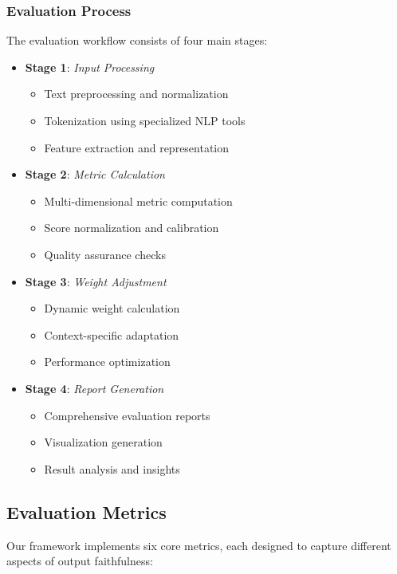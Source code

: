 \subsubsection{Evaluation Process}
The evaluation workflow consists of four main stages:
\begin{itemize}
    \item \textbf{Stage 1}: \textit{Input Processing}
    \begin{itemize}
        \item Text preprocessing and normalization
        \item Tokenization using specialized NLP tools
        \item Feature extraction and representation
    \end{itemize}
    
    \item \textbf{Stage 2}: \textit{Metric Calculation}
    \begin{itemize}
        \item Multi-dimensional metric computation
        \item Score normalization and calibration
        \item Quality assurance checks
    \end{itemize}
    
    \item \textbf{Stage 3}: \textit{Weight Adjustment}
    \begin{itemize}
        \item Dynamic weight calculation
        \item Context-specific adaptation
        \item Performance optimization
    \end{itemize}
    
    \item \textbf{Stage 4}: \textit{Report Generation}
    \begin{itemize}
        \item Comprehensive evaluation reports
        \item Visualization generation
        \item Result analysis and insights
    \end{itemize}
\end{itemize}

\subsection{Evaluation Metrics}
Our framework implements six core metrics, each designed to capture different aspects of output faithfulness:

